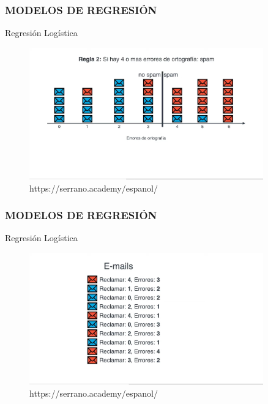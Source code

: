 \documentclass{beamer}
\begin{document}
\begin{frame}
	\frametitle{MODELOS DE REGRESIÓN}
	\begin{block}{Regresión Logística}	
		\begin{figure}
			\includegraphics[width=0.9\textwidth]{Imagenes_reg_log/IMG_3496.jpg}
			\caption{https://serrano.academy/espanol/}
		\end{figure}
	\end{block}
\end{frame}


\begin{frame}
	\frametitle{MODELOS DE REGRESIÓN}
	\begin{block}{Regresión Logística}	
		\begin{figure}
			\includegraphics[width=0.9\textwidth]{Imagenes_reg_log/IMG_3497.jpg}
			\caption{https://serrano.academy/espanol/}
		\end{figure}
	\end{block}
\end{frame}
	
\end{document}
